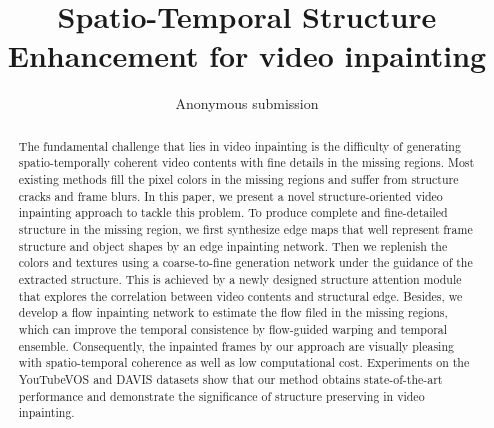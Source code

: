 \documentclass[letterpaper]{article} %
\title{Spatio-Temporal Structure Enhancement for video inpainting}
\author{Anonymous submission}
\begin{document}
\maketitle

\begin{abstract}
The fundamental challenge that lies in video inpainting is the difficulty of generating spatio-temporally coherent video contents with fine details in the missing regions. Most existing methods fill the pixel colors in the missing regions and suffer from structure cracks and frame blurs. In this paper, we present a novel structure-oriented video inpainting approach to tackle this problem. To produce complete and fine-detailed structure in the missing region, we first synthesize edge maps that well represent frame structure and object shapes by an edge inpainting network. Then we replenish the colors and textures using a coarse-to-fine generation network under the guidance of the extracted structure. This is achieved by a newly designed structure attention module that explores the correlation between video contents and structural edge. Besides, we develop a flow inpainting network to estimate the flow filed in the missing regions, which can improve the temporal consistence by flow-guided warping and temporal ensemble. Consequently, the inpainted frames by our approach are visually pleasing with spatio-temporal coherence as well as low computational cost. Experiments on the YouTubeVOS and DAVIS datasets show that our method obtains state-of-the-art performance and demonstrate the significance of structure preserving in video inpainting.
	
\end{abstract}


 












 

 
\end{document}
